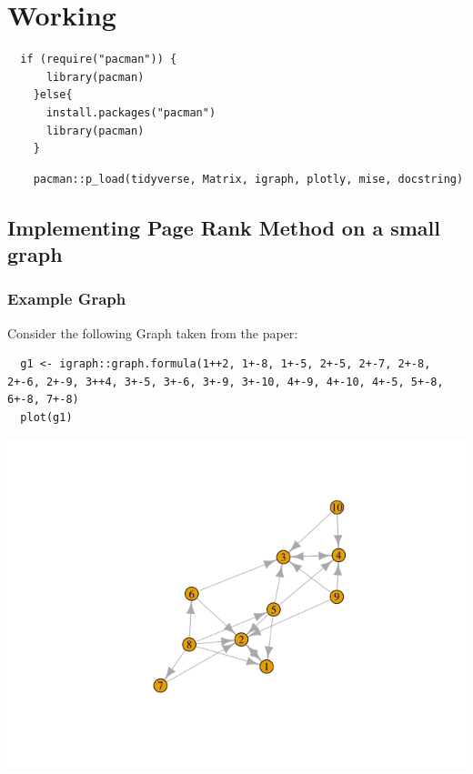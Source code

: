 \documentclass[11pt]{article}
\begin{document}
\section{Working}
\label{sec:orgaa1df7e}
\lstset{language=r,label= ,caption= ,captionpos=b,numbers=none}
\begin{lstlisting}
  if (require("pacman")) {
      library(pacman)
    }else{
      install.packages("pacman")
      library(pacman)
    }
\end{lstlisting}
\lstset{language=r,label= ,caption= ,captionpos=b,numbers=none}
\begin{lstlisting}
    pacman::p_load(tidyverse, Matrix, igraph, plotly, mise, docstring)
\end{lstlisting}

\subsection{Implementing Page Rank Method on a small graph}
\label{implementing-page-rank-methods}
\subsubsection{Example Graph}
\label{example-graph}
Consider the following Graph taken from the paper:

\lstset{language=r,label= ,caption= ,captionpos=b,numbers=none}
\begin{lstlisting}
  g1 <- igraph::graph.formula(1++2, 1+-8, 1+-5, 2+-5, 2+-7, 2+-8, 2+-6, 2+-9, 3++4, 3+-5, 3+-6, 3+-9, 3+-10, 4+-9, 4+-10, 4+-5, 5+-8, 6+-8, 7+-8)
  plot(g1)
\end{lstlisting}

\begin{center}
\includegraphics[width=.9\linewidth]{ImplementingPageRank/01PageRank_files/figure-html/unnamed-chunk-2-1.png}
\end{center}
\end{document}
